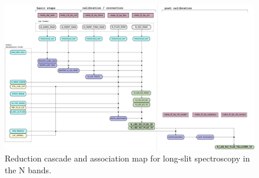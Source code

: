 \begin{figure}
  \centering
  \includegraphics[width=0.9\textheight]{figures/N_LSS_pipeline_wf_draft_latest_v0.74.png}
  \caption[Reduction cascade and association map for N long-slit
  spectroscopy]{Reduction cascade and association map for long-slit
    spectroscopy in the N bands.  }
  \label{Fig:NLssAssomap}
\end{figure}

